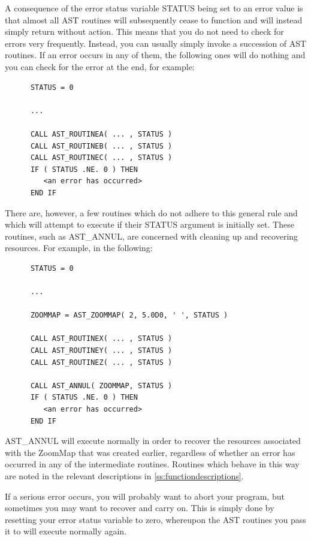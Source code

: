 \documentclass[twoside,11pt]{article}
\newcommand{\htmlref}[2]{#1}
\newcommand{\appref}[1]{Appendix~\ref{#1}}
\renewcommand{\appref}[1]{\ref{#1}}
\begin{document}
A consequence of the error status variable STATUS being set to an
error value is that almost all AST routines will subsequently cease to
function and will instead simply return without action.  This means
that you do not need to check for errors very frequently. Instead, you
can usually simply invoke a succession of AST routines. If an error
occurs in any of them, the following ones will do nothing and you can
check for the error at the end, for example:

\small
\begin{verbatim}
      STATUS = 0

      ...

      CALL AST_ROUTINEA( ... , STATUS )
      CALL AST_ROUTINEB( ... , STATUS )
      CALL AST_ROUTINEC( ... , STATUS )
      IF ( STATUS .NE. 0 ) THEN
         <an error has occurred>
      END IF
\end{verbatim}
\normalsize

There are, however, a few routines which do not adhere to this general
rule and which will attempt to execute if their STATUS argument is
initially set.  These routines, such as \htmlref{AST\_ANNUL}{AST_ANNUL}, are concerned with
cleaning up and recovering resources. For example, in the following:

\small
\begin{verbatim}
      STATUS = 0

      ...

      ZOOMMAP = AST_ZOOMMAP( 2, 5.0D0, ' ', STATUS )

      CALL AST_ROUTINEX( ... , STATUS )
      CALL AST_ROUTINEY( ... , STATUS )
      CALL AST_ROUTINEZ( ... , STATUS )

      CALL AST_ANNUL( ZOOMMAP, STATUS )
      IF ( STATUS .NE. 0 ) THEN
         <an error has occurred>
      END IF
\end{verbatim}
\normalsize

AST\_ANNUL will execute normally in order to recover the resources
associated with the ZoomMap that was created earlier, regardless of
whether an error has occurred in any of the intermediate routines.
Routines which behave in this way are noted in the relevant
descriptions in \appref{ss:functiondescriptions}.

If a serious error occurs, you will probably want to abort your
program, but sometimes you may want to recover and carry on.  This is
simply done by resetting your error status variable to zero, whereupon
the AST routines you pass it to will execute normally again.
\end{document}
